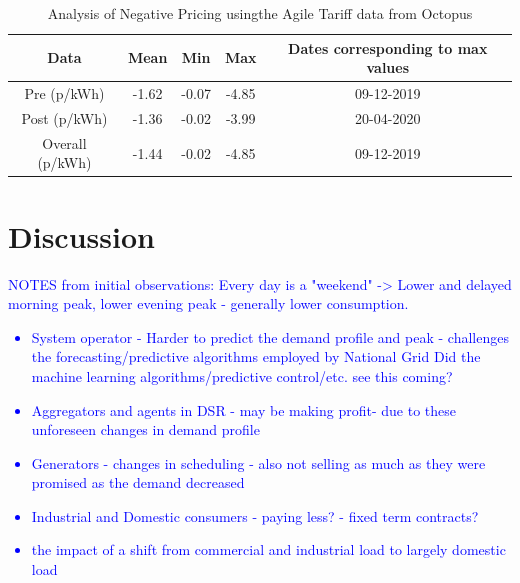 \documentclass[energies,article,submit,moreauthors,pdftex]{Definitions/mdpi}
\begin{document}
\begin{table}[H]
\caption{Analysis of Negative Pricing usingthe  Agile Tariff data from Octopus \cite{AgileEnergy} }\label{table:neg_agile_table}
\centering
\begin{tabular}{ccccc }
\toprule
\textbf{Data} & \textbf{Mean}	& \textbf{Min}	& \textbf{Max}& Dates corresponding to max values\\
\midrule
Pre	(p/kWh)	& -1.62			& -0.07         & -4.85 &09-12-2019\\
Post (p/kWh) & -1.36			& -0.02         & -3.99& 20-04-2020\\
Overall (p/kWh) & -1.44			& -0.02         & -4.85 &09-12-2019\\
\bottomrule
\end{tabular}
\end{table}



\section{Discussion}

\textcolor{blue}{
NOTES from initial observations: Every day is a "weekend" -> Lower and delayed morning peak, lower evening peak - generally lower consumption.
\begin{itemize}
    \item System operator - Harder to predict the demand profile and peak - challenges the forecasting/predictive algorithms employed by National Grid
    \subitem Did the machine learning algorithms/predictive control/etc. see this coming?
    \item Aggregators and agents in DSR - may be making profit- due to these unforeseen changes in demand profile
    \item Generators - changes in scheduling - also not selling as much as they were promised as the demand decreased
    \item Industrial and Domestic consumers - paying less? - fixed term contracts?
    \item the impact of a shift from commercial and industrial load to largely domestic load
\end{itemize}}
\end{document}
